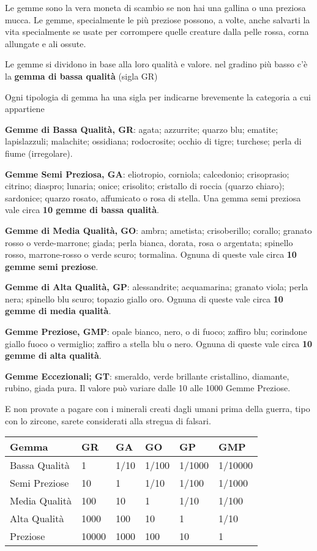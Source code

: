 \documentclass[12pt,a4paper,twoside,openany]{book}
\begin{document}
\begin{multicols}{2}
Le gemme sono la vera moneta di scambio se non hai una gallina o una preziosa mucca. Le gemme, specialmente le più preziose possono, a volte, anche salvarti la vita specialmente se usate per corrompere quelle creature dalla pelle rossa, corna allungate e ali ossute.

Le gemme si dividono in base alla loro qualità e valore. nel gradino più basso c'è la \textbf{gemma di bassa qualità} (sigla GR)

Ogni tipologia di gemma ha una sigla per indicarne brevemente la categoria a cui appartiene

\textbf{Gemme di Bassa Qualità, GR}: agata; azzurrite; quarzo blu; ematite; lapislazzuli; malachite; ossidiana; rodocrosite; occhio di tigre; turchese; perla di fiume (irregolare).

\textbf{Gemme Semi Preziosa, GA}: eliotropio, corniola; calcedonio; crisoprasio; citrino; diaspro; lunaria; onice; crisolito; cristallo di roccia (quarzo chiaro); sardonice; quarzo rosato, affumicato o rosa di stella. Una gemma semi preziosa vale circa \textbf{10 gemme di bassa qualità}.

\textbf{Gemme di Media Qualità, GO}: ambra; ametista; crisoberillo; corallo; granato rosso o verde-marrone; giada; perla bianca, dorata, rosa o argentata; spinello rosso, marrone-rosso o verde scuro; tormalina. Ognuna di queste vale circa \textbf{10 gemme semi preziose}.

\textbf{Gemme di Alta Qualità, GP}: alessandrite; acquamarina; granato viola; perla nera; spinello blu scuro; topazio giallo oro.  Ognuna di queste vale circa \textbf{10 gemme di media qualità}.

\textbf{Gemme Preziose, GMP}: opale bianco, nero, o di fuoco; zaffiro blu; corindone giallo fuoco o vermiglio; zaffiro a stella blu o nero. Ognuna di queste vale circa \textbf{10 gemme di alta qualità}.

\textbf{Gemme Eccezionali; GT}: smeraldo, verde brillante cristallino, diamante, rubino, giada pura. Il valore può variare dalle 10 alle 1000 Gemme Preziose.

E non provate a pagare con i minerali creati dagli umani prima della guerra, tipo con lo zircone, sarete considerati alla stregua di falsari.

\end{multicols}
\begin{center}
	\begin{tabular}{llllll}
	
\textbf{Gemma} & \textbf{GR}& \textbf{GA} &\textbf{GO} &\textbf{GP} &\textbf{GMP} \\
	\toprule
Bassa Qualità	& 1		 &1/10	&1/100	&1/1000	&1/10000 \\
Semi Preziose	& 10	 &1		&1/10	&1/100	&1/1000 \\
Media Qualità	& 100	 &10	&1		&1/10	&1/100	 \\
Alta Qualità 	& 1000   &100  	&10		&1	 	&1/10	\\
Preziose	 	& 10000  &1000 	&100  	&10		&1	\\

\end{tabular}

\end{center}
\end{document}
